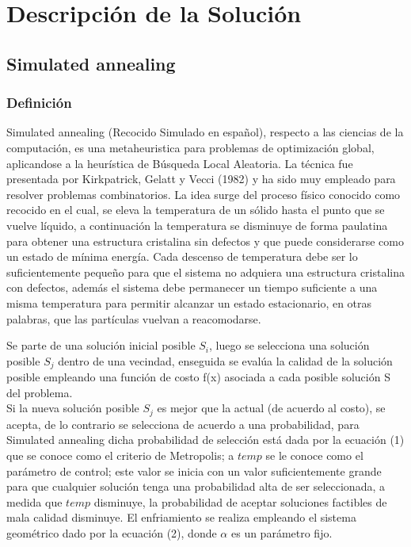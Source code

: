 \section{Descripci\'on de la Soluci\'on}

\subsection{Simulated annealing}
\subsubsection{Definición}
Simulated annealing (Recocido Simulado en español), respecto a las ciencias de la computación, es una metaheuristica para problemas de optimización global, aplicandose a la heurística de Búsqueda Local Aleatoria. La técnica fue presentada por Kirkpatrick, Gelatt y Vecci (1982) y ha sido
muy empleado para resolver problemas combinatorios.
La idea surge del proceso físico conocido como
recocido en el cual, se eleva la temperatura de un
sólido hasta el punto que se vuelve líquido, a continuación
la temperatura se disminuye de forma paulatina
para obtener una estructura cristalina sin defectos
y que puede considerarse como un estado de
mínima energía. Cada descenso de temperatura debe
ser lo suficientemente pequeño para que el sistema
no adquiera una estructura cristalina con defectos,
además el sistema debe permanecer un tiempo
suficiente a una misma temperatura para permitir
alcanzar un estado estacionario, en otras palabras,
que las partículas vuelvan a reacomodarse.


Se parte de una solución inicial posible $S_{i}$, luego se selecciona
una solución posible $S_{j}$ dentro de una vecindad, enseguida
se evalúa la calidad de la solución posible
empleando una función de costo f(x) asociada a cada posible solución S del problema.\\

Si la nueva solución posible $S_{j}$ es mejor que la actual
(de acuerdo al costo), se acepta, de lo contrario
se selecciona de acuerdo a una probabilidad, para
Simulated annealing dicha probabilidad de selección
está dada por la ecuación (1) que se conoce como
el criterio de Metropolis; a $temp$ se le conoce como
el parámetro de control; este valor se inicia con un valor
suficientemente grande para que cualquier solución
tenga una probabilidad alta de ser seleccionada,
a medida que $temp$ disminuye, la probabilidad de
aceptar soluciones factibles de mala calidad disminuye. El enfriamiento
se realiza empleando el sistema geométrico
dado por la ecuación (2), donde $\alpha$ es un parámetro
fijo.

